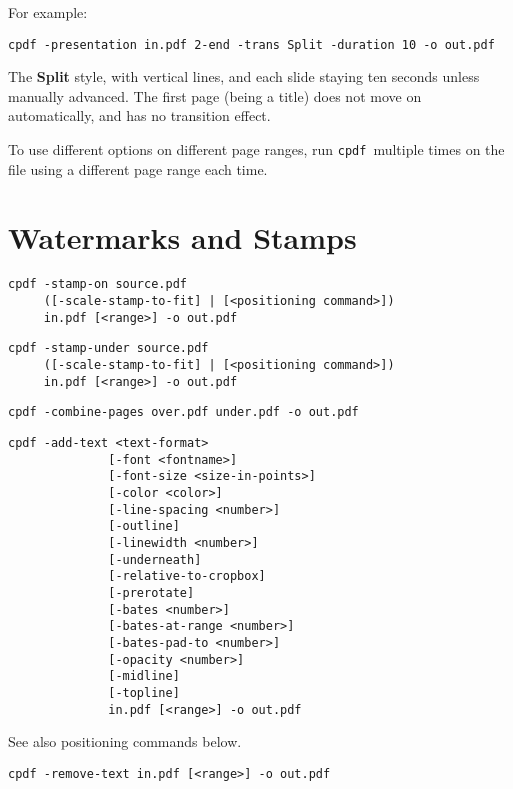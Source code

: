 \documentclass{book}
\newcommand{\cpdf}{\texttt{cpdf}}
\begin{document}
\noindent For example:
\begin{framed}
  \small
  \noindent\verb!cpdf -presentation in.pdf 2-end -trans Split -duration 10 -o out.pdf!

  \vspace{2.5mm}
  The \textbf{Split} style, with vertical lines, and each slide staying ten
seconds unless manually advanced. The first page (being a title) does not move
on automatically, and has no transition effect.

\end{framed}

\noindent To use different options on different page ranges, run \cpdf\ multiple times on
the file using a different page range each time.

\chapter{Watermarks and Stamps}
\label{stamps}
  \begin{framed}
  \noindent\small\verb!cpdf -stamp-on source.pdf!\\
  \noindent\small\verb!     ([-scale-stamp-to-fit] | [<positioning command>]) !\\
  \noindent\small\verb!     in.pdf [<range>] -o out.pdf!
  
  \vspace{1.5mm}
  \noindent\small\verb!cpdf -stamp-under source.pdf!\\
  \noindent\small\verb!     ([-scale-stamp-to-fit] | [<positioning command>]) !\\
  \noindent\small\verb!     in.pdf [<range>] -o out.pdf!

  \vspace{1.5mm}
  \noindent\small\verb!cpdf -combine-pages over.pdf under.pdf -o out.pdf!

  \vspace{1.5mm}
  \noindent\small\begin{verbatim}cpdf -add-text <text-format>
              [-font <fontname>]
              [-font-size <size-in-points>]
              [-color <color>]
              [-line-spacing <number>]
              [-outline]
              [-linewidth <number>]
              [-underneath]
              [-relative-to-cropbox]
              [-prerotate]
              [-bates <number>]
              [-bates-at-range <number>]
              [-bates-pad-to <number>]
              [-opacity <number>]
              [-midline]
              [-topline]
              in.pdf [<range>] -o out.pdf\end{verbatim}
  \noindent See also positioning commands below.

  \vspace{1.5mm}
  \noindent\small\verb!cpdf -remove-text in.pdf [<range>] -o out.pdf!
  \end{framed}
\end{document}
